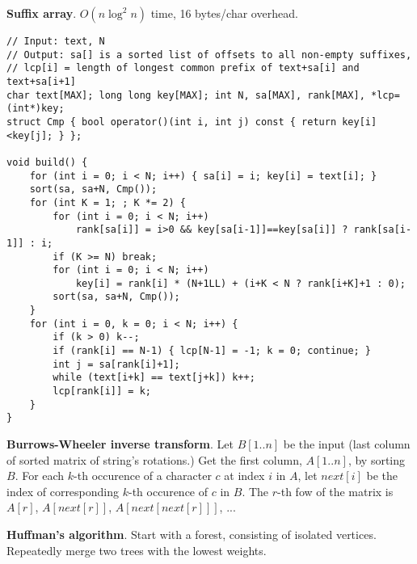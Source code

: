 \documentclass[a4paper, 12pt]{article}
\newcommand{\Topic}[1]{\textbf{#1}}
\begin{document}
\Topic{Suffix array}. $O(n \log^2 n)$ time, 16 bytes/char overhead.
\vspace{-3mm}
\begin{Verbatim}[fontsize=\small]
// Input: text, N
// Output: sa[] is a sorted list of offsets to all non-empty suffixes,
// lcp[i] = length of longest common prefix of text+sa[i] and text+sa[i+1]
char text[MAX]; long long key[MAX]; int N, sa[MAX], rank[MAX], *lcp=(int*)key;
struct Cmp { bool operator()(int i, int j) const { return key[i]<key[j]; } };

void build() {
    for (int i = 0; i < N; i++) { sa[i] = i; key[i] = text[i]; }
    sort(sa, sa+N, Cmp());
    for (int K = 1; ; K *= 2) {
        for (int i = 0; i < N; i++)
            rank[sa[i]] = i>0 && key[sa[i-1]]==key[sa[i]] ? rank[sa[i-1]] : i;
        if (K >= N) break;
        for (int i = 0; i < N; i++)
            key[i] = rank[i] * (N+1LL) + (i+K < N ? rank[i+K]+1 : 0);
        sort(sa, sa+N, Cmp());
    }
    for (int i = 0, k = 0; i < N; i++) {
        if (k > 0) k--;
        if (rank[i] == N-1) { lcp[N-1] = -1; k = 0; continue; }
        int j = sa[rank[i]+1];
        while (text[i+k] == text[j+k]) k++;
        lcp[rank[i]] = k;
    }
}
\end{Verbatim}

\vspace{-3mm}

\Topic{Burrows-Wheeler inverse transform}.  
Let $B[1..n]$ be the input (last column of sorted matrix of string's rotations.)
Get the first column, $A[1..n]$, by sorting $B$.
For each $k$-th occurence of a character $c$ at index $i$ in $A$,
let $next[i]$ be the index of corresponding $k$-th occurence of $c$ in $B$.
The $r$-th fow of the matrix is $A[r]$, $A[next[r]]$, $A[next[next[r]]]$, ...

\Topic{Huffman's algorithm}.  Start with a forest, consisting of isolated
vertices.  Repeatedly merge two trees with the lowest weights.

\begin{comment}
\Topic{Longest strictly-increasing subsequence in $O(n \log k)$}.
\parskip 0mm
\begin{verbatim}
template<typename T> vector<T> lis(const vector<T> &a) {
    vector<T> b;
    vector<size_t> len(a.size());

    size_t i, k = 0;
    for (i = 0; i < a.size(); i++) {
        // invariant: b[j] is the smallest number that ends
        // a strictly-increasing subsequence of length j+1 of a[0..i-1];
        // len[j] = length of LIS ending at a[j] for all j=0..i-1
        if (k == 0 || b.back() < a[i]) {
            b.push_back(a[i]);
            len[i] = ++k;
        } else {
            size_t j = lower_bound(b.begin(), b.end(), a[i]) - b.begin();
            b[j] = a[i];
            len[i] = j+1;
        }
    }

    const T *last = 0;
    for (i = a.size(); i-- != 0;)
        if (len[i]==k && (last==0 || a[i]<*last)) { b[--k]=a[i]; last=&a[i]; }
    return b;
}
\end{verbatim}
\parskip 3mm
\end{comment}
\end{document}

